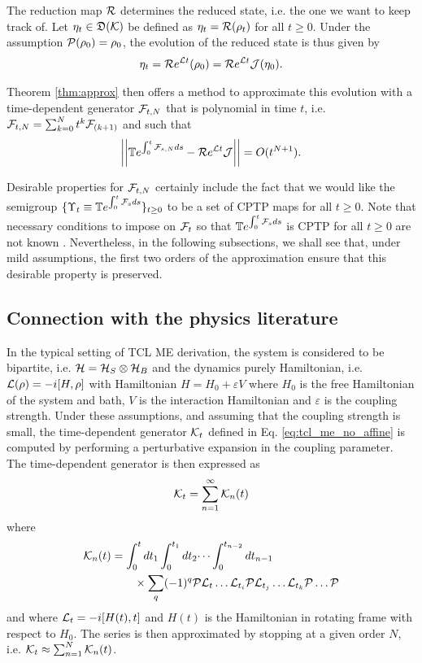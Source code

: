 \documentclass[10pt,aps,pra,twocolumn,showpacs,superscriptaddress,nobalancelastpage,notitlepage,nofootinbib,longbibliography]{revtex4-2}
\begin{document}
The reduction map $\mathcal{R}$ determines the reduced state, i.e. the one we want to keep track of. Let $\eta_t\in\mathfrak{D}(\mathcal{K})$ be defined as $\eta_t = \mathcal{R}(\rho_t)$ for all $t\geq0$. Under the assumption $\mathcal{P}(\rho_0)=\rho_0$,
the evolution of the reduced state is thus given by 
\begin{align*}
    \eta_t = \mathcal{R} e^{\mathcal{L} t} (\rho_0) = \mathcal{R} e^{\mathcal{L} t}\mathcal{J} (\eta_0).
\end{align*}

Theorem \ref{thm:approx} then offers a method to approximate this evolution with a time-dependent generator $\mathcal{F}_{t,N}$ that is polynomial in time $t$, i.e. $\mathcal{F}_{t,N} = \sum_{k=0}^N t^k \mathcal{F}_{(k+1)}$ and such that   
\[\left|\left| \mathbb{T} e^{\int_0^t \mathcal{F}_{s,N} ds} - \mathcal{R} e^{\mathcal{L} t} \mathcal{J} \right|\right| = O(t^{N+1}).\]

Desirable properties for $\mathcal{F}_{t,N}$ certainly include the fact that we would like the semigroup $\{\Upsilon_t \equiv \mathbb{T} e^{\int_0^t \mathcal{F}_s ds} \}_{t\geq0}$ to be a set of CPTP maps for all $t\geq0$. Note that necessary conditions to impose on $\mathcal{F}_t$ so that $\mathbb{T} e^{\int_0^t \mathcal{F}_s ds}$ is CPTP for all $t\geq0$ are not known \cite{benatti2024quantum}. Nevertheless, in the following subsections, we shall see that, under mild assumptions, the first two orders of the approximation ensure that this desirable property is preserved.

\subsection{Connection with the physics literature}
\label{sec:connection_with_literature}

In the typical setting of TCL ME derivation, the system is considered to be bipartite, i.e. $\mathcal{H}=\mathcal{H}_S\otimes\mathcal{H}_B$ and the dynamics purely Hamiltonian, i.e. $\mathcal{L}(\rho)=-i[H,\rho]$ with Hamiltonian $H = H_0 + \varepsilon V$ where $H_0$ is the free Hamiltonian of the system and bath, $V$ is the interaction Hamiltonian and $\varepsilon$ is the coupling strength.
Under these assumptions, and assuming that the coupling strength is small, the time-dependent generator $\mathcal{K}_t$ defined in Eq. \eqref{eq:tcl_me_no_affine} is computed by performing a perturbative expansion in the coupling parameter. The time-dependent generator is then expressed as 
\begin{align*}
    \mathcal{K}_t = \sum_{n=1}^\infty \mathcal{K}_n(t)
\end{align*}
where
\begin{align*}
    \mathcal{K}_n(t) &= \int_{0}^t dt_1 \int_0^{t_1} dt_2 \dots \int_0^{t_{n-2}}dt_{n-1}\\
    &\qquad \times \sum_q (-1)^q \mathcal{P} \mathcal{L}_{t} \dots \mathcal{L}_{t_i}\mathcal{P}\mathcal{L}_{t_j}\dots\mathcal{L}_{t_k}\mathcal{P}\dots\mathcal{P}
\end{align*}
and where $\mathcal{L}_t = -i[H(t),t]$ and $H(t)$ is the Hamiltonian in rotating frame with respect to $H_0$. The series is then approximated by stopping at a given order $N$, i.e. $\mathcal{K}_t\approx\sum_{n=1}^N\mathcal{K}_n(t)$.
\end{document}
